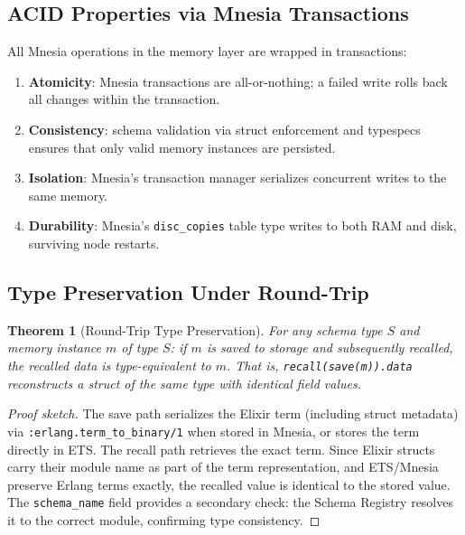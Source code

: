 \documentclass[12pt,a4paper]{article}
\newtheorem{theorem}{Theorem}[section]
\theoremstyle{definition}
\begin{document}
\subsection{ACID Properties via Mnesia Transactions}\label{subsec:acid}

All Mnesia operations in the memory layer are wrapped in transactions:

\begin{enumerate}
  \item \textbf{Atomicity}: Mnesia transactions are all-or-nothing; a failed write rolls back all changes within the transaction.
  \item \textbf{Consistency}: schema validation via struct enforcement and typespecs ensures that only valid memory instances are persisted.
  \item \textbf{Isolation}: Mnesia's transaction manager serializes concurrent writes to the same memory.
  \item \textbf{Durability}: Mnesia's \texttt{disc\_copies} table type writes to both RAM and disk, surviving node restarts.
\end{enumerate}

\subsection{Type Preservation Under Round-Trip}\label{subsec:round-trip}

\begin{theorem}[Round-Trip Type Preservation]\label{thm:round-trip}
For any schema type $S$ and memory instance $m$ of type $S$: if $m$ is saved to storage and subsequently recalled, the recalled data is type-equivalent to $m$.
That is, \texttt{recall(save(m)).data} reconstructs a struct of the same type with identical field values.
\end{theorem}

\begin{proof}[Proof sketch]
The save path serializes the Elixir term (including struct metadata) via \texttt{:erlang.term\_to\_binary/1} when stored in Mnesia, or stores the term directly in ETS.
The recall path retrieves the exact term.
Since Elixir structs carry their module name as part of the term representation, and ETS/Mnesia preserve Erlang terms exactly, the recalled value is identical to the stored value.
The \texttt{schema\_name} field provides a secondary check: the Schema Registry resolves it to the correct module, confirming type consistency.
\end{proof}
\end{document}
